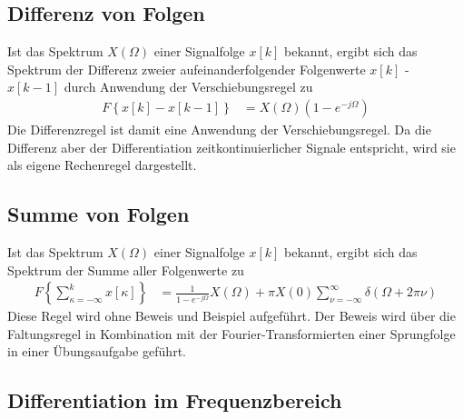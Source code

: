 \subsection{Differenz von Folgen}\label{sec:differenz-von-folgen}

Ist das Spektrum \(X(Ω)\) einer Signalfolge \(x[k]\) bekannt, ergibt sich das Spektrum der Differenz zweier aufeinanderfolgender Folgenwerte \(x[k]\) - \(x[k - 1]\) durch Anwendung der Verschiebungsregel zu
\begin{align}
F\left\{ x[ k] - x[ k - 1] \right\} &= X(\Omega)  \left( 1 - e^{- j  \Omega} \right) \label{eq:7.67}
\end{align}
Die Differenzregel ist damit eine Anwendung der Verschiebungsregel. Da die Differenz aber der Differentiation zeitkontinuierlicher Signale entspricht, wird sie als eigene Rechenregel dargestellt.

\subsection{Summe von Folgen}\label{sec:summe-von-folgen}

Ist das Spektrum \(X(Ω)\) einer Signalfolge \(x[k]\) bekannt, ergibt sich das Spektrum der Summe aller Folgenwerte zu
\begin{align}
F\left\{ \sum\limits_{\kappa = - \infty}^{k}{x[\kappa]} \right\} &= \frac{1}{1 - e^{- j  \Omega}}  X(\Omega) + \pi  X(0)  \sum\limits_{\nu = - \infty}^{\infty}{\delta(\Omega + 2  \pi  \nu)} \label{eq:7.68}
\end{align}
Diese Regel wird ohne Beweis und Beispiel aufgeführt. Der Beweis wird über die Faltungsregel in Kombination mit der Fourier-Transformierten einer Sprungfolge in einer Übungsaufgabe geführt.

\subsection{Differentiation im Frequenzbereich}\label{sec:differentiation-im-frequenzbereich}

